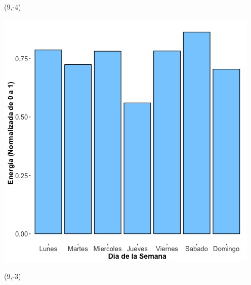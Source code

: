 \documentclass{article}\usepackage[]{graphicx}\usepackage[]{color}
\newenvironment{knitrout}{}{} %
\begin{document}
 \begin{textblock}{1}(9,-4)
\begin{minipage}{20em}
\begingroup

\endgroup
\end{minipage}
\end{textblock}


\begin{knitrout}
\color{fgcolor}
\includegraphics[scale=0.65]{figure/A26_day_of_week_plot} 
\end{knitrout}


 \begin{textblock}{1}(9,-3)
\begin{minipage}{20em}
\begingroup

\endgroup
\end{minipage}
\end{textblock}
\end{document}
